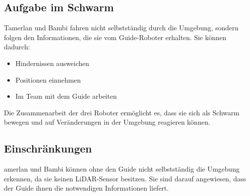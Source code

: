 \subsection{Aufgabe im Schwarm}
Tamerlan und Bambi fahren nicht selbstständig durch die Umgebung, sondern folgen den Informationen, die sie vom Guide-Roboter erhalten.
Sie können dadurch:
\begin{itemize}
    \item Hindernissen ausweichen
    \item Positionen einnehmen
    \item Im Team mit dem Guide arbeiten
\end{itemize}
Die Zusammenarbeit der drei Roboter ermöglicht es, dass sie sich als Schwarm bewegen und auf Veränderungen in der Umgebung reagieren können.
%
\subsection{ Einschränkungen}
amerlan und Bambi können ohne den Guide nicht selbstständig die Umgebung erkennen, da sie keinen LiDAR-Sensor besitzen. Sie sind darauf angewiesen, dass der Guide ihnen die notwendigen Informationen liefert.